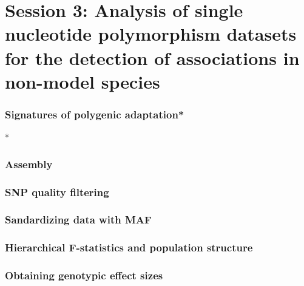 
\section[Session 3]{Session 3: Analysis of single nucleotide polymorphism
datasets for the detection of associations in non-model species}

\begin{frame}
\frametitle{Signatures of polygenic adaptation*}

\begin{block}{}

\end{block}
\tiny
*\citet{Berg:2014bs}
\end{frame}

\begin{frame}
\frametitle{Assembly}
\end{frame}

\begin{frame}
\frametitle{SNP quality filtering}
\end{frame}

\begin{frame}
\frametitle{Sandardizing data with MAF}
\end{frame}

\begin{frame}
\frametitle{Hierarchical F-statistics and population structure}
\end{frame}

\begin{frame}
\frametitle{Obtaining genotypic effect sizes}
\end{frame}

